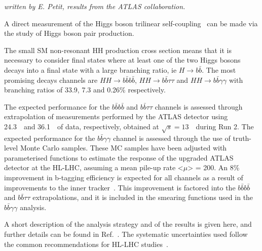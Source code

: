 \begin{center}
\textit{written by E. Petit, results from the ATLAS collaboration.}


\end{center}

A direct measurement of the Higgs boson trilinear self-coupling \lHHH\ can be made via the study of Higgs boson pair production. %

The small SM non-resonant HH production cross section means that it is necessary to consider final states where at least one of the two Higgs bosons decays into a final state with a large branching ratio, ie $H \rightarrow b\bar{b}$. The most promising decays channels are $HH \rightarrow b\bar{b}b\bar{b}$, $HH \rightarrow b\bar{b}\tau\tau$ and $HH \rightarrow b\bar{b}\gamma\gamma$ with branching ratios of 33.9, 7.3 and 0.26\% respectively.

The expected performance for the $b\bar{b}b\bar{b}$ and $b\bar{b}\tau\tau$ channels is assessed through extrapolation of measurements performed by the ATLAS detector using 24.3~\fbinv\ and 36.1~\fbinv\ of data, respectively, obtained at $\sqrt{s} = 13$~\TeV\ during Run 2.
The expected performance for the $b\bar{b}\gamma\gamma$ channel is assessed through the use of truth-level Monte Carlo samples. 
These MC samples have been adjusted with parameterised functions to estimate the response of the upgraded ATLAS detector at the HL-LHC, assuming a mean pile-up rate <$\mu$> = 200. 
An 8\% improvement in b-tagging efficiency is expected for all channels as a result of improvements to the inner tracker~\cite{ITKPixelTDR}.
This improvement is factored into the $b\bar{b}b\bar{b}$ and $b\bar{b}\tau\tau$ extrapolations, and it is included in the smearing functions used in the $b\bar{b}\gamma\gamma$ analysis.

A short description of the analysis strategy and of the results is given here, and further details can be found in Ref.~\cite{ATLASHHPUBnote}. The systematic uncertainties used follow the common recommendations for HL-LHC studies~\cite{ATLASperfPUBnote}. 



